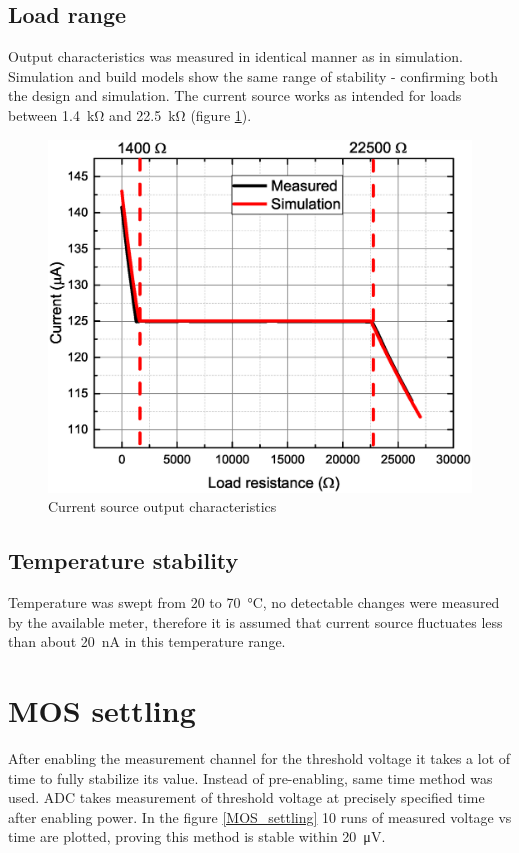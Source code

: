     \subsection{Load range}
        Output characteristics was measured in identical manner as in simulation. Simulation and build models show the same range of stability - confirming both the design and simulation. The current source works as intended for loads between \SI{1.4}{\kilo\ohm} and \SI{22.5}{\kilo\ohm} (figure \ref{Current_sensor_output_characteristics}).
        \begin{figure}[H]
            \centering
            \includegraphics[width=0.8\paperwidth]{img/07/output_resistance.eps}
            \caption{Current source output characteristics}
            \label{Current_sensor_output_characteristics}
        \end{figure}

    \subsection{Temperature stability}
        Temperature was swept from $20$ to \SI{70}{\degreeCelsius}, no detectable changes were measured by the available meter, therefore it is assumed that current source fluctuates less than about \SI{20}{\nano\ampere} in this temperature range.

\section{MOS settling}
    After enabling the measurement channel for the threshold voltage it takes a lot of time to fully stabilize its value. Instead of pre-enabling, same time method was used. ADC takes measurement of threshold voltage at precisely specified time after enabling power. In the figure \ref{MOS_settling} 10 runs of measured voltage vs time are plotted, proving this method is stable within \SI{20}{\uV}.

